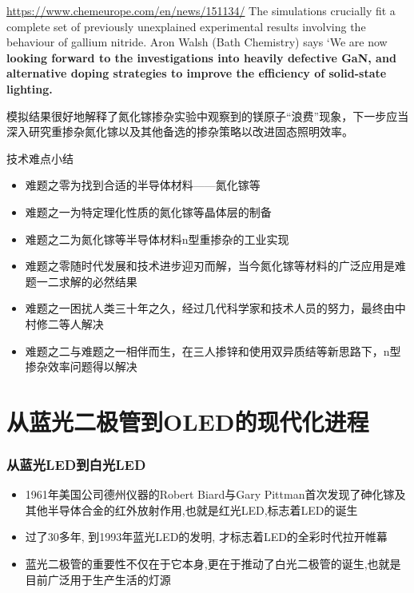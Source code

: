 \documentclass{beamer}
\newenvironment{slide}{
    \begin{frame}{\bfseries{\sectiontitle}}
}{
    \end{frame}
}
\let\sectiononly\section
\renewcommand{\section}[1]{
    \sectiononly{#1}
    \let\sectiontitle\relax
    \newcommand{\sectiontitle}{#1}
}
\begin{document}
\begin{slide}{\url{https://www.chemeurope.com/en/news/151134/}}
    The simulations crucially fit a complete set of previously unexplained experimental results involving the behaviour of gallium nitride. Aron Walsh (Bath Chemistry) says `We are now \textbf{looking forward to the investigations into heavily defective GaN, and alternative doping strategies to improve the efficiency of solid-state lighting.}
    \bigskip

    模拟结果很好地解释了氮化镓掺杂实验中观察到的镁原子“浪费”现象，下一步应当深入研究重掺杂氮化镓以及其他备选的掺杂策略以改进固态照明效率。
\end{slide}

\begin{slide}{技术难点小结}
    \begin{itemize}
    \item 难题之零为找到合适的半导体材料——氮化镓等
    \item 难题之一为特定理化性质的氮化镓等晶体层的制备
    \item 难题之二为氮化镓等半导体材料n型重掺杂的工业实现
    \end{itemize}
    \bigskip

    \begin{itemize}
    \item 难题之零随时代发展和技术进步迎刃而解，当今氮化镓等材料的广泛应用是难题一二求解的必然结果
    \item 难题之一困扰人类三十年之久，经过几代科学家和技术人员的努力，最终由中村修二等人解决
    \item 难题之二与难题之一相伴而生，在三人掺锌和使用双异质结等新思路下，n型掺杂效率问题得以解决
    \end{itemize}
\end{slide}

\part{从蓝光二极管到OLED的现代化进程}

\begin{frame}
    \partpage
    \tableofcontents
\end{frame}

\section{从蓝光LED到白光LED}

\begin{slide}
\begin{itemize}
    \item 1961年美国公司德州仪器的Robert Biard与Gary Pittman首次发现了砷化镓及其他半导体合金的红外放射作用,也就是红光LED,标志着LED的诞生
    \item 过了30多年, 到1993年蓝光LED的发明, 才标志着LED的全彩时代拉开帷幕
    \item 蓝光二极管的重要性不仅在于它本身,更在于推动了白光二极管的诞生,也就是目前广泛用于生产生活的灯源
\end{itemize}
\end{slide}
\end{document}
